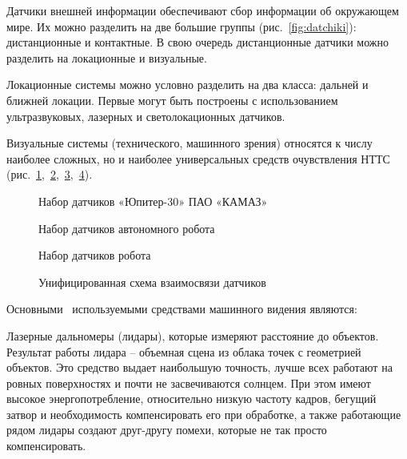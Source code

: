 Датчики внешней информации обеспечивают сбор информации об окружающем мире. Их можно разделить на две большие группы (рис.~\cref{fig:datchiki}): дистанционные и контактные. В свою очередь дистанционные датчики можно разделить на локационные и визуальные.

Локационные системы можно условно разделить на два класса: дальней и ближней локации. Первые могут быть построены с использованием ультразвуковых, лазерных и светолокационных датчиков.

Визуальные системы (технического, машинного зрения) относятся к числу наиболее сложных, но и наиболее универсальных средств очувствления НТТС (рис.~\cref{fig:kamaz},~\cref{fig:robot1},~\cref{fig:robot2},~\cref{fig:sensors}).

\begin{figure}[ht]
    \caption{Набор датчиков «Юпитер-30» ПАО «КАМАЗ»}\label{fig:kamaz}
\end{figure}

\begin{figure}[ht]
    \caption{Набор датчиков автономного робота}\label{fig:robot1}
\end{figure}

\begin{figure}[ht]
    \caption{Набор датчиков робота}\label{fig:robot2}
\end{figure}

\begin{figure}[ht]
    \caption{Унифицированная схема взаимосвязи датчиков}\label{fig:sensors}
\end{figure}


Основными~\cite{confbib1} используемыми средствами машинного видения являются:

Лазерные дальномеры (лидары), которые измеряют расстояние до объектов. Результат работы лидара – объемная сцена из облака точек с геометрией объектов. Это средство выдает наибольшую точность, лучше всех работают на ровных поверхностях и почти не засвечиваются солнцем. При этом имеют высокое энергопотребление, относительно низкую частоту кадров, бегущий затвор и необходимость компенсировать его при обработке, а также работающие рядом лидары создают друг-другу помехи, которые не так просто компенсировать.

